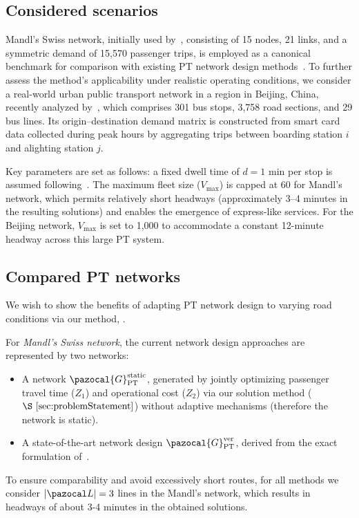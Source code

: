 \documentclass[a4paper,fleqn]{cas-sc}
\begin{document}
\subsection{Considered scenarios}
Mandl’s Swiss network, initially used by~\citet{mandl1980evaluation}, consisting of 15 nodes, 21 links, and a symmetric demand of 15{,}570 passenger trips, is employed as a canonical benchmark for comparison with existing PT network design methods~\citep{liang2025novel, ahern2022approximate}. To further assess the method’s applicability under realistic operating conditions, we consider a real-world urban public transport network in a region in Beijing, China, recently analyzed by~\citet{wu2024multi}, which comprises 301 bus stops, 3,758 road sections, and 29 bus lines. Its origin--destination demand matrix is constructed from smart card data collected during peak hours by aggregating trips between boarding station $i$ and alighting station $j$. 

Key parameters are set as follows: a fixed dwell time of $d=1$ min per stop is assumed following~\citet{chen2022TRSC}. 
The maximum fleet size ($V_{\max}$) is capped at 60 for Mandl’s network, which permits relatively short headways (approximately 3–4 minutes in the resulting solutions) and enables the emergence of express-like services. 
For the Beijing network, $V_{\max}$ is set to 1,000 to accommodate a constant 12-minute headway across this large PT system. 

\subsection{Compared PT networks}
\label{sec:compared-PT-networks}

We wish to show the benefits of adapting PT network design  to varying road conditions via our method, .

For \emph{Mandl’s Swiss network}, the current network design approaches are represented by two networks:
\begin{itemize}
\item A network $\pazocal{G}_{\text{PT}}^{\text{static}}$, generated by jointly optimizing passenger travel time ($Z_1$) and operational cost ($Z_2$) via our solution method ($\S~\ref{sec:problemStatement}$) without adaptive mechanisms (therefore the network is static).
\item A state-of-the-art network design $\pazocal{G}_{\text{PT}}^{\text{ver}}$, derived from the exact formulation of~\citet{vermeir2021exact}.
\end{itemize}
To ensure comparability and avoid excessively short routes, for all methods we consider $|\pazocal L|=3$ lines in the Mandl's network, which results in headways of about 3-4 minutes in the obtained solutions.
\end{document}
